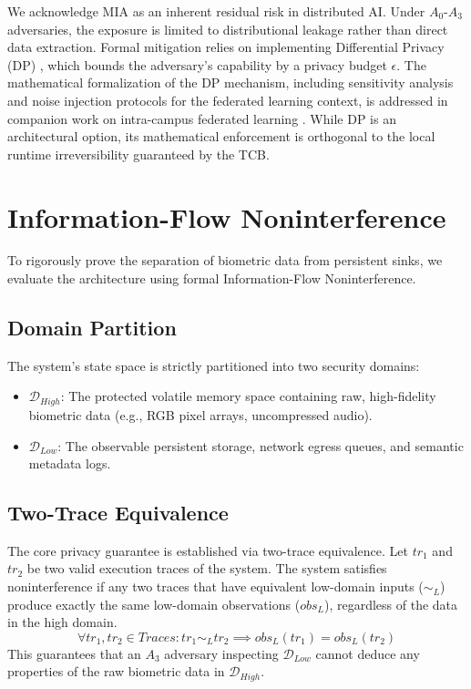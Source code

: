 \documentclass[conference]{IEEEtran}
\begin{document}
We acknowledge MIA as an inherent residual risk in distributed AI. Under $A_0$-$A_3$ adversaries, the exposure is limited to distributional leakage rather than direct data extraction. Formal mitigation relies on implementing Differential Privacy (DP) \cite{b14, b22}, which bounds the adversary's capability by a privacy budget $\epsilon$. The mathematical formalization of the DP mechanism, including sensitivity analysis and noise injection protocols for the federated learning context, is addressed in companion work on intra-campus federated learning \cite{b29_fl}. While DP is an architectural option, its mathematical enforcement is orthogonal to the local runtime irreversibility guaranteed by the TCB.

\section{Information-Flow Noninterference}

To rigorously prove the separation of biometric data from persistent sinks, we evaluate the architecture using formal Information-Flow Noninterference.

\subsection{Domain Partition}
The system's state space is strictly partitioned into two security domains:
\begin{itemize}
    \item $\mathcal{D}_{High}$: The protected volatile memory space containing raw, high-fidelity biometric data (e.g., RGB pixel arrays, uncompressed audio).
    \item $\mathcal{D}_{Low}$: The observable persistent storage, network egress queues, and semantic metadata logs.
\end{itemize}

\subsection{Two-Trace Equivalence}
The core privacy guarantee is established via two-trace equivalence. Let $tr_1$ and $tr_2$ be two valid execution traces of the system. The system satisfies noninterference if any two traces that have equivalent low-domain inputs ($\sim_L$) produce exactly the same low-domain observations ($obs_L$), regardless of the data in the high domain.
\begin{equation}
\forall tr_1, tr_2 \in Traces : tr_1 \sim_L tr_2 \implies obs_L(tr_1) = obs_L(tr_2)
\end{equation}
This guarantees that an $A_3$ adversary inspecting $\mathcal{D}_{Low}$ cannot deduce any properties of the raw biometric data in $\mathcal{D}_{High}$.
\end{document}
